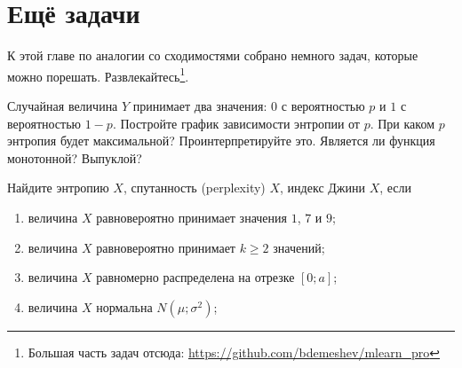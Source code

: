 \documentclass[12pt, a4paper, oneside]{article}
\begin{document}


\section{Ещё задачи}

К этой главе по аналогии со сходимостями собрано немного задач, которые можно порешать. Развлекайтесь\footnote{Большая часть задач отсюда: \url{https://github.com/bdemeshev/mlearn_pro}}. 

\begin{problem}{}
Случайная величина $Y$ принимает два значения: $0$ с вероятностью $p$ и $1$ с вероятностью $1-p$. Постройте график зависимости энтропии от $p$. При каком $p$ энтропия будет максимальной? Проинтерпретируйте это. Является ли функция монотонной? Выпуклой? 	
\end{problem}

\begin{problem}{ }
Найдите энтропию $X$, спутанность (perplexity) $X$, индекс Джини $X$, если
\begin{enumerate}
  \item величина $X$ равновероятно принимает значения $1$, $7$ и $9$;
  \item величина $X$ равновероятно принимает $k\geq 2$ значений;
  \item величина $X$ равномерно распределена на отрезке $[0;a]$;
  \item величина $X$ нормальна $N(\mu;\sigma^2)$;
\end{enumerate}
\end{problem}

\end{document}

